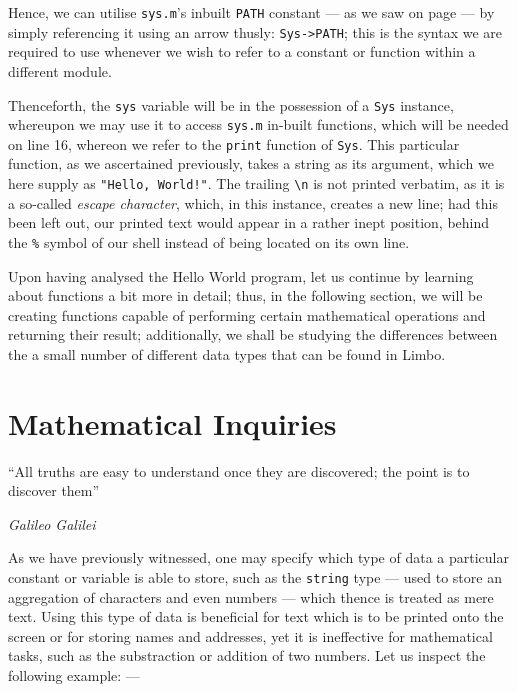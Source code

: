 \documentclass[a5paper,twoside,12pt]{report}
\begin{document}
Hence, we can utilise \texttt{sys.m}'s inbuilt \texttt{PATH} constant — as we saw on page \pageref{sys.m} — by simply referencing it using an arrow thusly: \texttt{Sys->PATH}; this is the syntax we are required to use whenever we wish to refer to a constant or function within a different module.

Thenceforth, the \texttt{sys} variable will be in the possession of a \texttt{Sys} instance, whereupon we may use it to access \texttt{sys.m} in-built functions, which will be needed on line 16, whereon we refer to the \texttt{print} function of \texttt{Sys}. This particular function, as we ascertained previously, takes a string as its argument, which we here supply as \texttt{"Hello, World!"}. The trailing \texttt{\textbackslash n} is not printed verbatim, as it is a so-called \textit{escape character}, which, in this instance, creates a new line; had this been left out, our printed text would appear in a rather inept position, behind the \texttt{\%} symbol of our shell instead of being located on its own line.

Upon having analysed the Hello World program, let us continue by learning about functions a bit more in detail; thus, in the following section, we will be creating functions capable of performing certain mathematical operations and returning their result; additionally, we shall be studying the differences between the a small number of different data types that can be found in Limbo. 

\newpage

\chapter*{Mathematical Inquiries}
\epigraph{``All truths are easy to understand once they are discovered; the point is to discover them''}{\textit{Galileo Galilei}}

As we have previously witnessed, one may specify which type of data a particular constant or variable is able to store, such as the \texttt{string} type — used to store an aggregation of characters and even numbers — which thence is treated as mere text. Using this type of data is beneficial for text which is to be printed onto the screen or for storing names and addresses, yet it is ineffective for mathematical tasks, such as the substraction or addition of two numbers. Let us inspect the following example: —
\end{document}
